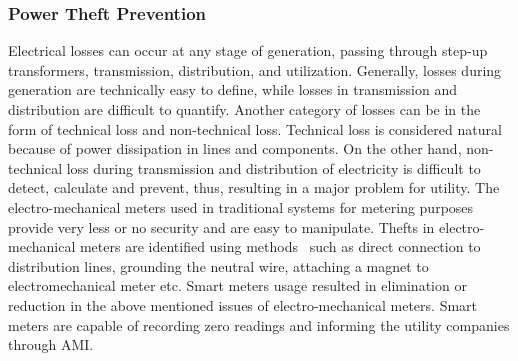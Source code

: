  \subsubsection{Power Theft Prevention}
Electrical losses can occur at any stage of generation, passing
through step-up transformers, transmission, distribution, and utilization. Generally, losses during generation are technically easy to define, while losses in transmission and distribution are difficult to quantify. Another category of losses can be in the form of technical loss
and non-technical loss. Technical loss is considered natural because of power dissipation in lines and components. On the other hand, non-technical loss during transmission and distribution of electricity is difficult to detect, calculate and prevent, thus, resulting in a major problem for utility. The electro-mechanical meters used in traditional systems for metering purposes provide very less or no security and are easy to manipulate. Thefts in electro-mechanical meters are identified using methods~\cite{Anas2012} such as direct connection to distribution lines, grounding the neutral wire, attaching a magnet to electromechanical meter 
etc. Smart meters usage resulted in elimination or reduction in the above mentioned issues of electro-mechanical meters. Smart meters are capable of recording zero readings and informing the utility companies through AMI.


